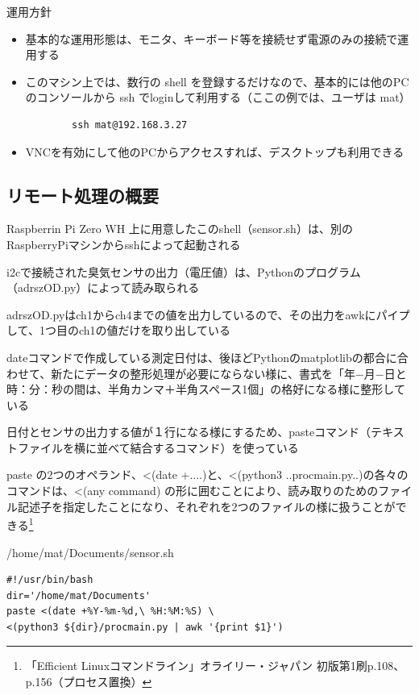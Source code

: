 \documentclass[12pt,a4paper,uplatex]{jsarticle}
\begin{document}
運用方針

\begin{itemize}
	\item 基本的な運用形態は、モニタ、キーボード等を接続せず電源のみの接続で運用する
	\item このマシン上では、数行の shell を登録するだけなので、基本的には他のPCのコンソールから ssh でloginして利用する（ここの例では、ユーザは mat）
	\begin{verbatim}
		ssh mat@192.168.3.27
	\end{verbatim}
	\item VNCを有効にして他のPCからアクセスすれば、デスクトップも利用できる
\end{itemize}

\subsection{リモート処理の概要}

	Raspberrin Pi Zero WH 上に用意したこのshell（sensor.sh）は、別のRaspberryPiマシンからsshによって起動される
	
	i2cで接続された臭気センサの出力（電圧値）は、Pythonのプログラム（adrszOD.py）によって読み取られる
	
	adrszOD.pyはch1からch4までの値を出力しているので、その出力をawkにパイプして、1つ目のch1の値だけを取り出している
	
	dateコマンドで作成している測定日付は、後ほどPythonのmatplotlibの都合に合わせて、新たにデータの整形処理が必要にならない様に、書式を「年−月−日と時：分：秒の間は、半角カンマ＋半角スペース1個」の格好になる様に整形している
	
	日付とセンサの出力する値が１行になる様にするため、pasteコマンド（テキストファイルを横に並べて結合するコマンド）を使っている\footnotemark[1]
	
	paste の2つのオペランド、<(date +....)と、<(python3 ..procmain.py..)の各々のコマンドは、<(any command) の形に囲むことにより、読み取りのためのファイル記述子を指定したことになり、それぞれを2つのファイルの様に扱うことができる\footnote[1]{「Efficient Linuxコマンドライン」オライリー・ジャパン 初版第1刷p.108、p.156（プロセス置換）}

\begin{itembox}[l]{/home/mat/Documents/sensor.sh}
	\begin{verbatim}
#!/usr/bin/bash
dir='/home/mat/Documents'
paste <(date +%Y-%m-%d,\ %H:%M:%S) \
<(python3 ${dir}/procmain.py | awk '{print $1}')
	\end{verbatim}
\end{itembox}
\end{document}
